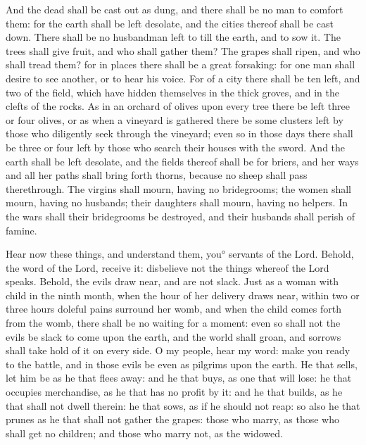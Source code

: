 {And the dead shall be cast out as dung, and there shall be no man to comfort them: for the earth shall be left desolate, and the cities thereof shall be cast down.
There shall be no husbandman left to till the earth, and to sow it.
The trees shall give fruit, and who shall gather them?
The grapes shall ripen, and who shall tread them? for in
{} places there shall be a great forsaking:
for one man shall desire to see another, or to hear his voice.
For of a city there shall be ten left, and two of the field, which have hidden themselves in the thick groves, and in the clefts of the rocks.
As in an orchard of olives upon every tree there be left three or four olives,
or as when a vineyard is gathered there be some clusters left by those who diligently seek through the vineyard;
even so in those days there shall be three or four left by those who search their houses with the sword.
And the earth shall be left desolate, and the fields thereof shall be for briers, and her ways and all her paths shall bring forth thorns, because no sheep shall pass therethrough.
The virgins shall mourn, having no bridegrooms; the women shall mourn, having no husbands; their daughters shall mourn, having no helpers.
In the wars shall their bridegrooms be destroyed, and their husbands shall perish of famine.
\par }{\PP {}Hear now these things, and understand them, you° servants of the Lord.
Behold, the word of the Lord, receive it: disbelieve not the things whereof the Lord speaks.
Behold, the evils draw near, and are not slack.
Just as a woman with child in the ninth month, when the hour of her delivery draws near, within two or three hours doleful pains surround her womb, and when the child comes forth from the womb, there shall be no waiting for a moment:
even so shall not the evils be slack to come upon the earth, and the world shall groan, and sorrows shall take hold of it on every side.
O my people, hear my word: make you ready to the battle, and in those evils be even as pilgrims upon the earth.
He that sells, let him be as he that flees away: and he that buys, as one that will lose:
he that occupies merchandise, as he that has no profit by it: and he that builds, as he that shall not dwell therein:
he that sows, as if he should not reap: so also he that prunes
{} as he that shall not gather the grapes:
those who marry, as those who shall get no children; and those who marry not, as the widowed.
}

